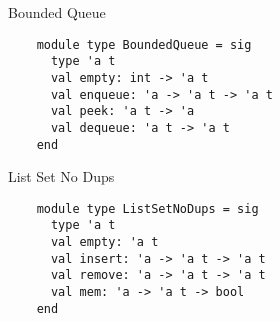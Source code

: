 \documentclass{beamer}
\begin{document}
    \begin{frame}[fragile=singleslide]{Bounded Queue}
    \begin{verbatim}
    module type BoundedQueue = sig
      type 'a t
      val empty: int -> 'a t
      val enqueue: 'a -> 'a t -> 'a t
      val peek: 'a t -> 'a
      val dequeue: 'a t -> 'a t
    end
    \end{verbatim}
    \end{frame}
    
    \begin{frame}[fragile=singleslide]{List Set No Dups}
    \begin{verbatim}
    module type ListSetNoDups = sig
      type 'a t
      val empty: 'a t
      val insert: 'a -> 'a t -> 'a t
      val remove: 'a -> 'a t -> 'a t
      val mem: 'a -> 'a t -> bool
    end
    \end{verbatim}
    \end{frame}
\end{document}
